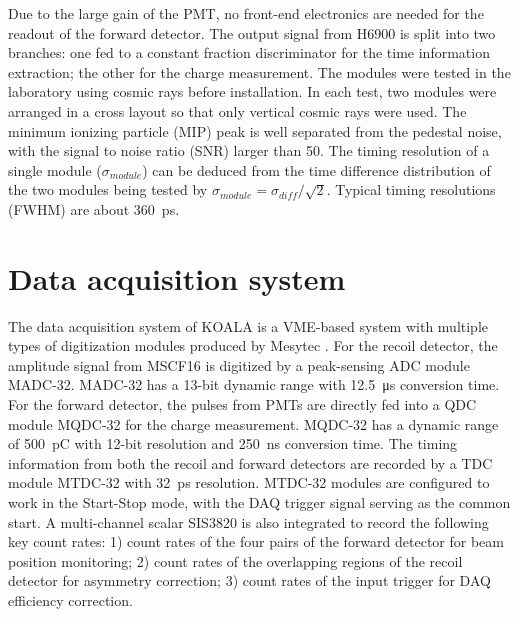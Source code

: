 \documentclass[number,5p]{elsarticle}
\begin{document}
Due to the large gain of the PMT, no front-end electronics are needed for the readout of the forward detector.
The output signal from H6900 is split into two branches: one fed to a
constant fraction discriminator for the time information extraction; the other
for the charge measurement.
The modules were tested in the laboratory using cosmic rays before installation.
In each test, two modules were arranged in a cross layout so that only vertical
cosmic rays were used.
The minimum ionizing particle (MIP) peak is well separated from the pedestal
noise, with the signal to noise ratio (SNR) larger than 50.
The timing resolution of a single module ($\sigma_{module}$) can be deduced from
the time difference distribution of the two modules being tested by $\sigma_{module}=\sigma_{diff}/\sqrt{2}$.
Typical timing resolutions (FWHM) are about \SI{360}{\pico\second}.

\section{Data acquisition system}
\label{sec:daq}

The data acquisition system of KOALA is a VME-based system with multiple types
of digitization modules produced by Mesytec \cite{mesytec}.
For the recoil detector, the amplitude signal from MSCF16 is digitized by a
peak-sensing ADC module MADC-32.
MADC-32 has a 13-bit dynamic range with \SI{12.5}{\micro\second} conversion time.
For the forward detector, the pulses from PMTs are directly fed into a QDC
module MQDC-32 for the charge measurement.
MQDC-32 has a dynamic range of \SI{500}{\pico\coulomb} with 12-bit resolution
and \SI{250}{\nano\second} conversion time.
The timing information from both the recoil and forward detectors are recorded
by a TDC module MTDC-32 with \SI{32}{\pico\second} resolution.
MTDC-32 modules are configured to work in the Start-Stop mode, with the DAQ
trigger signal serving as the common start.
A multi-channel scalar SIS3820 \cite{sis} is also integrated to record
the following key count rates: 1) count rates of the four pairs of the forward detector for beam position monitoring; 2) count rates of the overlapping regions of the recoil detector for asymmetry correction; 3) count rates of the input trigger for DAQ efficiency correction.
\end{document}
